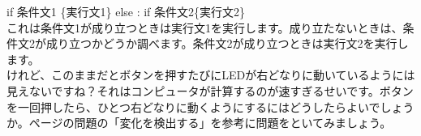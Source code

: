 if 条件文1 \{実行文1\} else : if 条件文2\{実行文2\}\\
これは条件文1が成り立つときは実行文1を実行します。成り立たないときは、条件文2が成り立つかどうか調べます。条件文2が成り立つときは実行文2を実行します。 \\

けれど、このままだとボタンを押すたびにLEDが右どなりに動いているようには見えないですね？それはコンピュータが計算するのが速すぎるせいです。ボタンを一回押したら、ひとつ右どなりに動くようにするにはどうしたらよいでしょうか。\pageref{button_led2_toi}ページの問題の「変化を検出する」を参考に問題をといてみましょう。\\

\begin{tcolorbox}[title=\useOmetoi]
\begin{enumerate}
\end{enumerate}
\end{tcolorbox}
